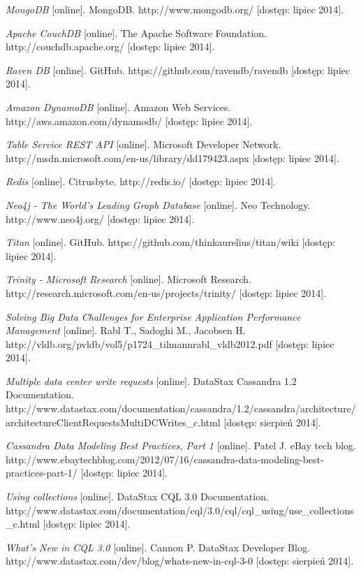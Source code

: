 \begin{thebibliography}{}
  \emph{MongoDB} [online].
  MongoDB.
  http://www.mongodb.org/ [dostęp: lipiec 2014].
 
  \emph{Apache CouchDB} [online].
  The Apache Software Foundation.
  http://couchdb.apache.org/ [dostęp: lipiec 2014].
 
  \emph{Raven DB} [online].
  GitHub.
  https://github.com/ravendb/ravendb [dostęp: lipiec 2014].
 
  \emph{Amazon DynamoDB} [online].
  Amazon Web Services.
  http://aws.amazon.com/dynamodb/ [dostęp: lipiec 2014].
 
  \emph{Table Service REST API} [online].
  Microsoft Developer Network.
  http://msdn.microsoft.com/en-us/library/dd179423.aspx [dostęp: lipiec 2014].
 
  \emph{Redis} [online].
  Citrusbyte.
  http://redis.io/ [dostęp: lipiec 2014].
 
  \emph{Neo4j - The World's Leading Graph Database} [online].
  Neo Technology.
  http://www.neo4j.org/ [dostęp: lipiec 2014].
 
  \emph{Titan} [online].
  GitHub.
  https://github.com/thinkaurelius/titan/wiki [dostęp: lipiec 2014].
 
  \emph{Trinity - Microsoft Research} [online].
  Microsoft Research.
  http://research.microsoft.com/en-us/projects/trinity/ [dostęp: lipiec 2014].
 
  \emph{Solving Big Data Challenges for Enterprise Application Performance Management} [online].
  Rabl T., Sadoghi M., Jacobsen H.
  http://vldb.org/pvldb/vol5/p1724\_tilmannrabl\_vldb2012.pdf [dostęp: lipiec 2014].
 
  \emph{Multiple data center write requests} [online].
  DataStax Cassandra 1.2 Documentation.
  http://www.datastax.com/documentation/cassandra/1.2/cassandra/architecture/architectureClientRequestsMultiDCWrites\_c.html [dostęp: sierpień 2014].
 
  \emph{Cassandra Data Modeling Best Practices, Part 1} [online].
  Patel J.
  eBay tech blog.
  http://www.ebaytechblog.com/2012/07/16/cassandra-data-modeling-best-practices-part-1/ [dostęp: lipiec 2014].
 
  \emph{Using collections} [online].
  DataStax CQL 3.0 Documentation.
  http://www.datastax.com/documentation/cql/3.0/cql/cql\_using/use\_collections\_c.html [dostęp: lipiec 2014].
 
  \emph{What’s New in CQL 3.0} [online].
  Cannon P.
  DataStax Developer Blog.
  http://www.datastax.com/dev/blog/whats-new-in-cql-3-0 [dostęp: sierpień 2014].
  
\end{thebibliography}
